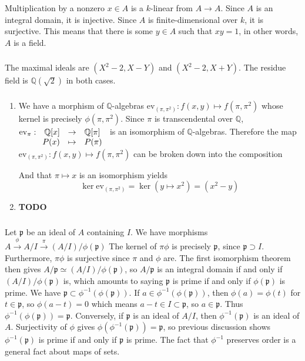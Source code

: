 \documentclass{article}
\newcommand{\ev}{\mathrm{ev}}
\newcommand{\Q}{\mathbb{Q}}
\newcommand{\todo}{\textbf{TODO}}
\newcommand{\applic}[4]{\begin{array}[t]{rcl}
#1 & \to & #2 \\
#3 & \mapsto & #4
\end{array}}
\newcommand{\p}{\mathfrak{p}}
\newcommand{\exercise}{\subsubsection} %
\begin{document}
\exercise{} Multiplication by a nonzero $x\in A$ is a $k$-linear from $A \to A$. Since $A$ is an integral domain, it is injective. Since $A$ is finite-dimensional over $k$, it is surjective. This means that there is some $y \in A$ such that $xy=1$, in other words, $A$ is a field.

\exercise{} The maximal ideals are $(X^2 - 2, X-Y)$ and $(X^2 - 2, X+Y)$. The residue field is $\Q(\sqrt{2})$ in both cases.

\exercise{} 
\begin{enumerate}
    \item We have a morphism of $\Q$-algebras $\mathrm{ev}_{(\pi,\pi^2)} : f(x,y) \mapsto f(\pi,\pi^2)$ whose kernel is precisely $\phi(\pi,\pi^2)$. Since $\pi$ is transcendental over $\Q$, $\mathrm{ev}_\pi : \applic{\Q[x]}{\Q[\pi]}{P(x)}{P(\pi)}$ is an isomorphism of $\Q$-algebras. Therefore the map $\mathrm{ev}_{(\pi,\pi^2)} : f(x,y) \mapsto f(\pi,\pi^2)$ can be broken down into the composition
    \begin{center}
    \end{center}
    And that $\pi \mapsto x$ is an isomorphism yields
    \[\ker \ev_{(\pi,\pi^2)} = \ker (y \mapsto x^2) = (x^2 - y)\]
    \item \todo
\end{enumerate}

\exercise{} Let $\p$ be an ideal of $A$ containing $I$. We have morphisms
$A \xrightarrow{\phi} A/I \xrightarrow{\pi} (A/I)/\phi(\p)$
The kernel of $\pi\phi$ is precisely $\p$, since $\p \supset I$. Furthermore, $\pi \phi$ is surjective since $\pi$ and $\phi$ are. The first isomorphism theorem then gives $A/\p \simeq (A/I)/\phi(\p)$, so $A/\p$ is an integral domain if and only if $(A/I)/\phi(\p)$ is, which amounts to saying $\p$ is prime if and only if $\phi(\p)$ is prime. We have $\p \subset \phi^{-1}(\phi(\p))$. If $a \in \phi^{-1}(\phi(\p))$, then $\phi(a) = \phi(t)$ for $t \in \p$, so $\phi(a-t) = 0$ which means $a-t \in I \subset \p$, so $a \in \p$. Thus $\phi^{-1}(\phi(\p)) = \p$. Conversely, if $\p$ is an ideal of $A/I$, then $\phi^{-1}(\p)$ is an ideal of $A$. Surjectivity of $\phi$ gives $\phi(\phi^{-1}(\p)) = \p$, so previous discussion shows $\phi^{-1}(\p)$ is prime if and only if $\p$ is prime. The fact that $\phi^{-1}$ preserves order is a general fact about maps of sets.
\end{document}
